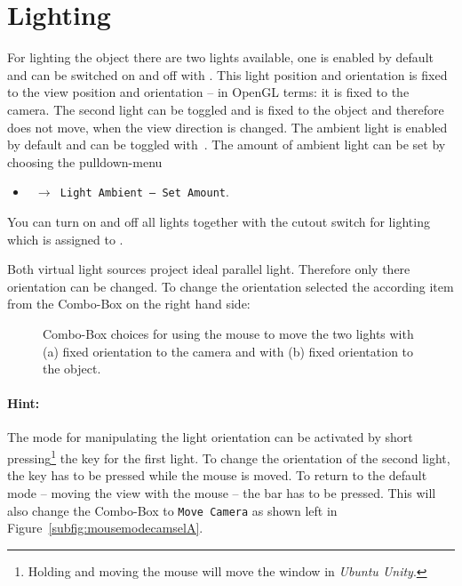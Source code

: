 \newpage
\section{Lighting}
\label{sec:lighting}

For lighting the object there are two lights available, one is enabled by default and can be switched on and off with \!\!. 
This light position and orientation is fixed to the view position and orientation -- in OpenGL terms: it is fixed to the camera.
The second light can be toggled \!\! and is fixed to the object and therefore does not move, when the view direction is changed.
The ambient light is enabled by default and can be toggled with~\!\!.
The amount of ambient light can be set by choosing the pulldown-menu
\begin{itemize}
	\item[] \texttt{ $\rightarrow$ Light Ambient -- Set Amount}.
\end{itemize}
You can turn on and off all lights together with the cutout switch for lighting which is assigned to \!\!.

Both virtual light sources project ideal parallel light.
Therefore only there orientation can be changed.
To change the orientation selected the according item from the Combo-Box on the right hand side:
\begin{figure}[!hbt]
	\centering
	 \quad
	\caption{ Combo-Box choices for using the mouse to move the two lights with 
	          (a) fixed orientation to the camera and with 
	          (b) fixed orientation to the object.
	}
	\label{fig:mousemodelights}
\end{figure}

\paragraph{Hint:} The mode for manipulating the light orientation can be activated by short pressing\footnote{Holding \!\Alt and moving the mouse will move the window in \emph{Ubuntu Unity}.} 
the \!\Alt key for the first light.
To change the orientation of the second light, the \!\AltGr key has to be pressed while the mouse is moved.
To return to the default mode -- moving the view with the mouse -- the \!\Spacebar bar has to be pressed.
This will also change the Combo-Box to \texttt{Move Camera} as shown left in Figure~\ref{subfig:mousemodecamselA}.


